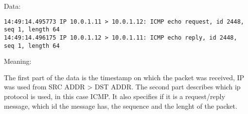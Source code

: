 \newline Data:
\begin{lstlisting}
14:49:14.495773 IP 10.0.1.11 > 10.0.1.12: ICMP echo request, id 2448, seq 1, length 64
14:49:14.496175 IP 10.0.1.12 > 10.0.1.11: ICMP echo reply, id 2448, seq 1, length 64
\end{lstlisting}
Meaning: 

The first part of the data is the timestamp on which the packet was received, IP was used from SRC ADDR > DST ADDR. The second part describes which ip protocol is used, in this case ICMP. It also specifies if it is a request/reply message, which id the message has, the sequence and the lenght of the packet.